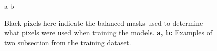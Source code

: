 \documentclass[11pt, review]{elsarticle} %
\begin{document}
\begin{figure} [!htb]
    \centering
    a{
        }\hspace{5pt}
    b{
        }
    \caption{Black pixels here indicate the balanced masks used to determine what pixels were used when training the models. \textbf{a, b: }Examples of two subsection from the training dataset.}
    \label{fig:balancedmasks}
\end{figure}
\end{document}
